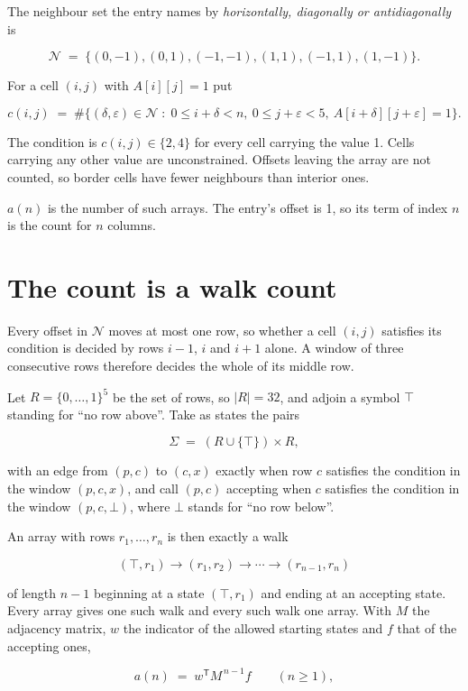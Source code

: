 \documentclass[11pt]{article}
\theoremstyle{definition}
\begin{document}
The neighbour set the entry names by {\itshape horizontally, diagonally or antidiagonally} is

\[\mathcal{N} \;=\; \{(0,-1), (0,1), (-1,-1), (1,1), (-1,1), (1,-1)\}.\]

For a cell $(i,j)$ with $A[i][j] = 1$ put

\[c(i,j) \;=\; \#\bigl\{(\delta,\varepsilon)\in\mathcal{N} \;:\; 0\le i+\delta<n,\ 0\le j+\varepsilon<5,\ A[i+\delta][j+\varepsilon] = 1\bigr\}.\]

The condition is $c(i,j) \in \{2, 4\}$ for every cell carrying the value 1. Cells carrying any other value are unconstrained. Offsets leaving the array are not counted, so border cells have fewer neighbours than interior ones.

$a(n)$ is the number of such arrays. The entry's offset is 1, so its term of index $n$ is the count for $n$ columns.

\section{The count is a walk count}

Every offset in $\mathcal{N}$ moves at most one row, so whether a cell $(i,j)$ satisfies its condition is decided by rows $i-1$, $i$ and $i+1$ alone. A window of three consecutive rows therefore decides the whole of its middle row.

Let $R = \{0,\dots,1\}^{5}$ be the set of rows, so $|R| = 32$, and adjoin a symbol $\top$ standing for ``no row above''. Take as states the pairs

\[\Sigma \;=\; (R \cup \{\top\}) \times R,\]

with an edge from $(p,c)$ to $(c,x)$ exactly when row $c$ satisfies the condition in the window $(p,c,x)$, and call $(p,c)$ accepting when $c$ satisfies the condition in the window $(p,c,\bot)$, where $\bot$ stands for ``no row below''.

An array with rows $r_1,\dots,r_n$ is then exactly a walk

\[(\top,r_1) \to (r_1,r_2) \to \cdots \to (r_{n-1},r_n)\]

of length $n-1$ beginning at a state $(\top,r_1)$ and ending at an accepting state. Every array gives one such walk and every such walk one array. With $M$ the adjacency matrix, $w$ the indicator of the allowed starting states and $f$ that of the accepting ones,

\[a(n) \;=\; w^{\mathsf T} M^{\,n-1} f \qquad (n \ge 1),\]
\end{document}
